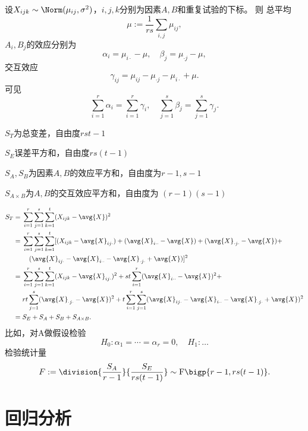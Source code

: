 设$X_{ijk}\sim\Norm(\mu_{ij},\sigma^2)$，$i, j, k $分别为因素$ A, B $和重复试验的下标。
则
总平均
\[
	\mu:=\frac1{rs}\sum_{i,j}\mu_{ij},
\]
$A_i,B_j$的效应分别为
\[
	\alpha_i=\mu_{i\cdot}-\mu,\quad\beta_j=\mu_{\cdot j}-\mu,
\]
交互效应
\[
	\gamma_{ij}=\mu_{ij}-\mu_{\cdot j}-\mu_{i\cdot}+\mu.
\]
可见
\[
	\sum_{i=1}^r\alpha_i=\sum_{i=1}^r\gamma_i,\quad\sum_{j=1}^s\beta_j=\sum_{j=1}^s\gamma_j.
\]
\begin{compactitem}
	\item $S_T$为总变差，自由度$rst-1$
	\item $S_E$误差平方和，自由度$rs(t-1)$
	\item $S_A,S_B$为因素$ A, B $的效应平方和，自由度为$ r - 1, s - 1$
	\item $S_{A\times B}$为$A,B$的交互效应平方和，自由度为 $(r - 1)(s - 1)$
\end{compactitem}
\begin{align}
	\notag
	S_T={}& \sum_{i=1}^r \sum_{j=1}^s \sum_{k=1}^t(X_{i j k}-\avg{X})^2 \\
	\notag
	={}& \sum_{i=1}^r \sum_{j=1}^s \sum_{k=1}^t[(X_{i j k}-\avg{X}_{i j \cdot})+(\avg{X}_{i\cdot\cdot}-\avg{X})+(\avg{X}_{\cdot j \cdot}-\avg{X})+\\
	\notag
	&\quad(\avg{X}_{i j \cdot}-\avg{X}_{i \cdot\cdot}-\avg{X}_{\cdot j \cdot}+\avg{X})]^2 \\
	\notag
	={}& \sum_{i=1}^r \sum_{j=1}^s \sum_{k=1}^t(X_{i j k}-\avg{X}_{i j \cdot})^2+s t \sum_{i=1}^r(\avg{X}_{i\cdot\cdot}-\avg{X})^2+ \\
	\notag
	& r t \sum_{j=1}^s(\avg{X}_{\cdot j \cdot}-\avg{X})^2+t \sum_{i=1}^r \sum_{j=1}^s(\avg{X}_{i j \cdot}-\avg{X}_{i\cdot\cdot}-\avg{X}_{\cdot j \cdot}+\avg{X})^2\\
	={}&S_E+S_A+S_B+S_{A\times B}.
\end{align}
比如，对A做假设检验
\[
	H_0:\alpha_1=\cdots=\alpha_r=0,\quad H_1:\ldots
\]
检验统计量 
\[
	F:=\division{\frac{S_A}{r-1}}{\frac{S_E}{rs(t-1)}}\sim\mathrm F\bigp{r-1,rs(t-1)}.
\]

\section{回归分析}

